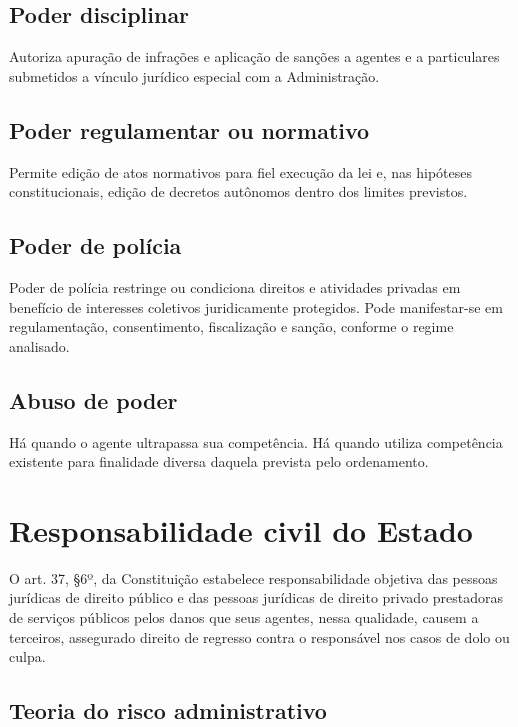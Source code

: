 \subsection{Poder disciplinar}

Autoriza apuração de infrações e aplicação de sanções a agentes e a particulares submetidos a vínculo jurídico especial com a Administração.

\subsection{Poder regulamentar ou normativo}

Permite edição de atos normativos para fiel execução da lei e, nas hipóteses constitucionais, edição de decretos autônomos dentro dos limites previstos.

\subsection{Poder de polícia}

Poder de polícia restringe ou condiciona direitos e atividades privadas em benefício de interesses coletivos juridicamente protegidos. Pode manifestar-se em regulamentação, consentimento, fiscalização e sanção, conforme o regime analisado.

\subsection{Abuso de poder}

Há  quando o agente ultrapassa sua competência. Há  quando utiliza competência existente para finalidade diversa daquela prevista pelo ordenamento.

\section{Responsabilidade civil do Estado}

O art. 37, §6º, da Constituição estabelece responsabilidade objetiva das pessoas jurídicas de direito público e das pessoas jurídicas de direito privado prestadoras de serviços públicos pelos danos que seus agentes, nessa qualidade, causem a terceiros, assegurado direito de regresso contra o responsável nos casos de dolo ou culpa.

\subsection{Teoria do risco administrativo}

